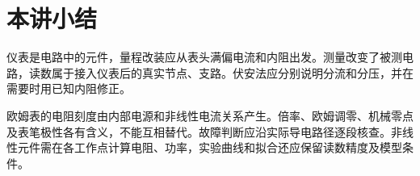 \section{本讲小结}

仪表是电路中的元件，量程改装应从表头满偏电流和内阻出发。测量改变了被测电路，读数属于接入仪表后的真实节点、支路。伏安法应分别说明分流和分压，并在需要时用已知内阻修正。

欧姆表的电阻刻度由内部电源和非线性电流关系产生。倍率、欧姆调零、机械零点及表笔极性各有含义，不能互相替代。故障判断应沿实际导电路径逐段核查。非线性元件需在各工作点计算电阻、功率，实验曲线和拟合还应保留读数精度及模型条件。

